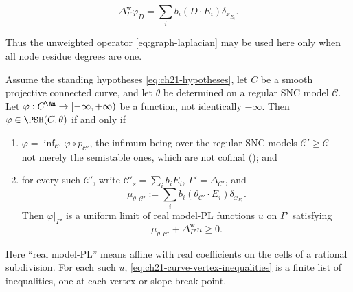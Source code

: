 \begin{equation}
\label{eq:ch21-weighted-model-measure}
 \Delta^{\mathrm w}_{\Gamma}\varphi_D
 =\sum_i b_i(D\cdot E_i)\delta_{x_{E_i}}.
\end{equation}

Thus the unweighted operator \eqref{eq:graph-laplacian} may be used here
only when all node residue degrees are one.

\begin{proposition}
\label{prop:ch21-curve-criterion}
Assume the standing hypotheses \eqref{eq:ch21-hypotheses}, let $C$ be a
smooth projective connected curve, and let $\theta$ be determined on a
regular SNC model $\mathcal C$.  Let
$\varphi:C^{\An}\to[-\infty,+\infty)$ be a function, not identically
$-\infty$.  Then $\varphi\in\PSH(C,\theta)$ if and only if
\begin{enumerate}
\item\label{itm:ch21-cc:inf}
$\varphi=\inf_{\mathcal C'}\varphi\circ p_{\mathcal C'}$, the infimum
being over the regular SNC models $\mathcal C'\geq\mathcal C$---not
merely the semistable ones, which are not cofinal
(); and
\item\label{itm:ch21-cc:pl}
for every such $\mathcal C'$, write
$\mathcal C'_s=\sum_i b_iE_i$, $\Gamma'=\Delta_{\mathcal C'}$, and
\begin{equation}
\label{eq:ch21-curve-reference-measure}
 \mu_{\theta,\mathcal C'}
 :=\sum_i b_i(\theta_{\mathcal C'}\cdot E_i)\delta_{x_{E_i}}.
\end{equation}
Then $\varphi|_{\Gamma'}$ is a uniform limit of real model-PL functions
$u$ on $\Gamma'$ satisfying
\begin{equation}
\label{eq:ch21-curve-vertex-inequalities}
 \mu_{\theta,\mathcal C'}+\Delta^{\mathrm w}_{\Gamma'}u\geq0.
\end{equation}
\end{enumerate}
Here ``real model-PL'' means affine with real coefficients on the cells of a
rational subdivision.  For each such $u$,
\eqref{eq:ch21-curve-vertex-inequalities} is a finite list of inequalities,
one at each vertex or slope-break point.
\end{proposition}


